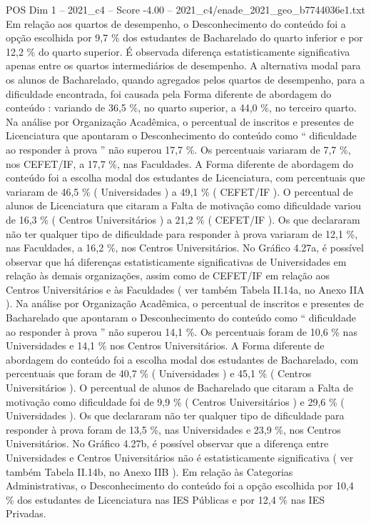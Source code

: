 \begin{textsample}{POS Dim 1 – 2021\_c4 – Score -4.00 – 2021\_c4/enade\_2021\_geo\_b7744036e1.txt}
Em relação aos quartos de desempenho, o Desconhecimento do conteúdo foi a opção escolhida por 9,7 \% dos estudantes de Bacharelado do quarto inferior e por 12,2 \% do quarto superior.
É observada diferença estatisticamente significativa apenas entre os quartos intermediários de desempenho.
A alternativa modal para os alunos de Bacharelado, quando agregados pelos quartos de desempenho, para a dificuldade encontrada, foi causada pela Forma diferente de abordagem do conteúdo : variando de 36,5 \%, no quarto superior, a 44,0 \%, no terceiro quarto.
Na análise por Organização Acadêmica, o percentual de inscritos e presentes de Licenciatura que apontaram o Desconhecimento do conteúdo como “ dificuldade ao responder à prova ” não superou 17,7 \%.
Os percentuais variaram de 7,7 \%, nos CEFET/IF, a 17,7 \%, nas Faculdades.
A Forma diferente de abordagem do conteúdo foi a escolha modal dos estudantes de Licenciatura, com percentuais que variaram de 46,5 \% ( Universidades ) a 49,1 \% ( CEFET/IF ).
O percentual de alunos de Licenciatura que citaram a Falta de motivação como dificuldade variou de 16,3 \% ( Centros Universitários ) a 21,2 \% ( CEFET/IF ).
Os que declararam não ter qualquer tipo de dificuldade para responder à prova variaram de 12,1 \%, nas Faculdades, a 16,2 \%, nos Centros Universitários.
No Gráfico 4.27a, é possível observar que há diferenças estatisticamente significativas de Universidades em relação às demais organizações, assim como de CEFET/IF em relação aos Centros Universitários e às Faculdades ( ver também Tabela II.14a, no Anexo IIA ).
Na análise por Organização Acadêmica, o percentual de inscritos e presentes de Bacharelado que apontaram o Desconhecimento do conteúdo como “ dificuldade ao responder à prova ” não superou 14,1 \%.
Os percentuais foram de 10,6 \% nas Universidades e 14,1 \% nos Centros Universitários.
A Forma diferente de abordagem do conteúdo foi a escolha modal dos estudantes de Bacharelado, com percentuais que foram de 40,7 \% ( Universidades ) e 45,1 \% ( Centros Universitários ).
O percentual de alunos de Bacharelado que citaram a Falta de motivação como dificuldade foi de 9,9 \% ( Centros Universitários ) e 29,6 \% ( Universidades ).
Os que declararam não ter qualquer tipo de dificuldade para responder à prova foram de 13,5 \%, nas Universidades e 23,9 \%, nos Centros Universitários.
No Gráfico 4.27b, é possível observar que a diferença entre Universidades e Centros Universitários não é estatisticamente significativa ( ver também Tabela II.14b, no Anexo IIB ).
Em relação às Categorias Administrativas, o Desconhecimento do conteúdo foi a opção escolhida por 10,4 \% dos estudantes de Licenciatura nas IES Públicas e por 12,4 \% nas IES Privadas.

\end{textsample}
